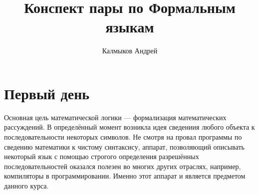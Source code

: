 \documentclass[a4paper, 12pt]{article}
\title{Конспект пары по Формальным языкам}
\author{Калмыков Андрей}
\begin{document}
\maketitle
\newpage
\section*{Первый день}
Основная цель математической логики --- формализация математических рассуждений. В определённый момент возникла идея сведениия любого объекта к последовательности некоторых символов. Не смотря на провал программы по сведению математики к чистому синтаксису, аппарат, позволяющий описывать некоторый язык с помощью строгого определения разрешённых последовательностей оказался полезен во многих других отраслях, например, компиляторы в программировании. Именно этот аппарат и является предметом данного курса.
\end{document}

